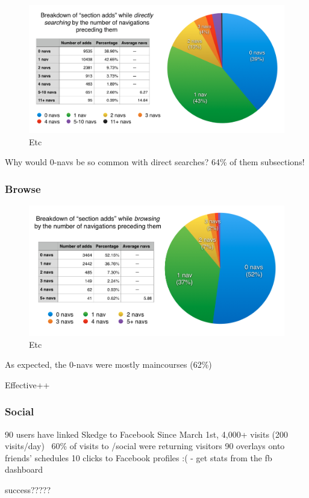   \begin{figure}
    \centering
    \includegraphics[width=1.0\textwidth]{images/graph/direct_navs}

    \caption{Etc}
    \label{fig:searchtypes}
  \end{figure}

  Why would 0-navs be so common with direct searches? 64\% of them subsections!

  \subsubsection{Browse}

  \begin{figure}
    \centering
    \includegraphics[width=1.0\textwidth]{images/graph/browse_navs}

    \caption{Etc}
    \label{fig:searchtypes}
  \end{figure}

  As expected, the 0-navs were mostly maincourses (62\%)

  Effective++

  \subsubsection{Social}

  90 users have linked Skedge to Facebook
  Since March 1st,
  4,000+ visits (200 visits/day)
  ~60\% of visits to /social were returning visitors
  90 overlays onto friends’ schedules
  10 clicks to Facebook profiles :(
  - get stats from the fb dashboard

  success?????